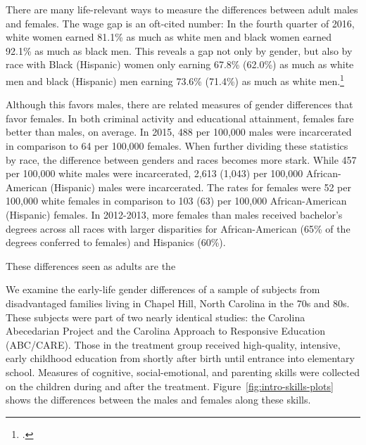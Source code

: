 There are many life-relevant ways to measure the differences between adult males and females. The wage gap is an oft-cited number: In the fourth quarter of 2016, white women earned 81.1\% as much as white men and black women earned 92.1\% as much as black men. This reveals a gap not only by gender, but also by race with Black (Hispanic) women only earning 67.8\% (62.0\%) as much as white men and black (Hispanic) men earning 73.6\% (71.4\%) as much as white men.\footnote{\citet{USDPTL_2017_Wage_News-Release}.}

 Although this favors males, there are related measures of gender differences that favor females. In both criminal activity and educational attainment, females fare better than males, on average. In 2015, 488 per 100,000 males were incarcerated in comparison to 64 per 100,000 females. When further dividing these statistics by race, the difference between genders and races becomes more stark. While 457 per 100,000 white males were incarcerated, 2,613 (1,043) per 100,000 African-American (Hispanic) males were incarcerated. The rates for females were 52 per 100,000 white females in comparison to 103 (63) per 100,000 African-American (Hispanic) females. In 2012-2013, more females than males received bachelor's degrees across all races with larger disparities for African-American (65\% of the degrees conferred to females) and Hispanics (60\%).

These differences seen as adults are the 

We examine the early-life gender differences of a sample of subjects from disadvantaged families living in Chapel Hill, North Carolina in the 70s and 80s. These subjects were part of two nearly identical studies: the Carolina Abecedarian Project and the Carolina Approach to Responsive Education (ABC/CARE). Those in the treatment group received high-quality, intensive, early childhood education from shortly after birth until entrance into elementary school. Measures of cognitive, social-emotional, and parenting skills were collected on the children during and after the treatment. Figure~\ref{fig:intro-skills-plots} shows the differences between the males and females along these skills.

